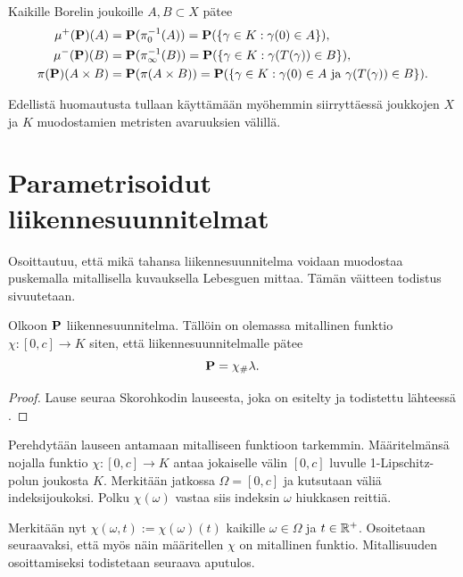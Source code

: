 \documentclass[12pt,oneside,a4paper]{amsbook} %
\begin{document}
\begin{remark}
    Kaikille Borelin joukoille $A, B \subset X$ pätee
    \begin{align*}
        \mu^+(\P)(A) &= \P(\pi_0^{-1}(A)) = \P(\{\gamma \in K : \gamma(0) \in A\}), \\
        \mu^-(\P)(B) &= \P(\pi_\infty^{-1}(B)) = \P(\{\gamma \in K : \gamma(T(\gamma)) \in B\}), \\
        \pi(\P)(A\times B) &= \P(\pi(A\times B)) = \P(\{\gamma \in K: \gamma(0) \in A\text{ ja } \gamma(T(\gamma)) \in B\}).
    \end{align*}
\end{remark}

Edellistä huomautusta tullaan käyttämään myöhemmin siirryttäessä joukkojen $X$ ja $K$ muodostamien metristen avaruuksien välillä.

\section{Parametrisoidut liikennesuunnitelmat}

Osoittautuu, että mikä tahansa liikennesuunnitelma voidaan muodostaa puskemalla mitallisella kuvauksella Lebesguen mittaa. Tämän väitteen todistus sivuutetaan.

\begin{theorem}\label{thm:skorohkod}
    Olkoon $\P$ liikennesuunnitelma. Tällöin on olemassa mitallinen funktio $\chi: [0, c] \to K$ siten, että liikennesuunnitelmalle pätee $$\P =\chi_\# \lambda.$$
\end{theorem}
\begin{proof}
    Lause seuraa Skorohkodin lauseesta, joka on esitelty ja todistettu lähteessä \cite[s. 185]{optimal}.
\end{proof}

Perehdytään lauseen antamaan mitalliseen funktioon tarkemmin. Määritelmänsä nojalla funktio $ \chi:[0, c] \to K$ antaa jokaiselle välin $[0, c]$ luvulle 1-Lipschitz-polun joukosta $K$. Merkitään jatkossa $\Omega = [0,c]$ ja kutsutaan väliä indeksijoukoksi. Polku $ \chi(\omega)$ vastaa siis indeksin $\omega$ hiukkasen reittiä.

Merkitään nyt $\chi(\omega, t) :=  \chi(\omega)(t)$ kaikille $\omega \in \Omega$ ja $t \in \R^+$. Osoitetaan seuraavaksi, että myös näin määritellen $\chi$ on mitallinen funktio. Mitallisuuden osoittamiseksi todistetaan seuraava aputulos.
\end{document}
